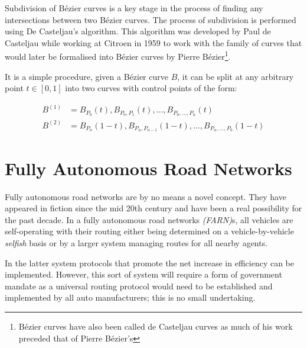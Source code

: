 Subdivision of Bézier curves is a key stage in the process of finding any intersections between two Bézier curves. The process of subdivision is performed using De Casteljau's algorithm. This algorithm was developed by Paul de Casteljau while working at Citroen in 1959 to work with the family of curves that would later be formalised into Bézier curves by Pierre Bézier\footnote{Bézier curves have also been called de Casteljau curves as much of his work preceded that of Pierre Bézier's}.

It is a simple procedure, given a Bézier curve $B$, it can be split at any arbitrary point $t \in [0,1]$ into two curves with control points of the form:

\begin{align}
  B^{(1)} &= B_{P_{0}}(t), B_{P_{0},P_1}(t), \ldots, B_{P_{0},\ldots,P_{n}}(t) \\
  B^{(2)} &= B_{P_{n}}(1-t), B_{P_{n},P_{n-1}}(1-t), \ldots, B_{P_{n},\ldots,P_{0}}(1-t)
\end{align}


\section{Fully Autonomous Road Networks}

Fully autonomous road networks are by no means a novel concept. They have appeared in fiction since the mid 20th century and have been a real possibility for the past decade. In a fully autonomous road networks \textit{(FARN)}s, all vehicles are self-operating with their routing either being determined on a vehicle-by-vehicle \textit{selfish} basis or by a larger system managing routes for all nearby agents. 

In the latter system protocols that promote the net increase in efficiency can be implemented. However, this sort of system will require a form of government mandate as a universal routing protocol would need to be established and implemented by all auto manufacturers; this is no small undertaking.


